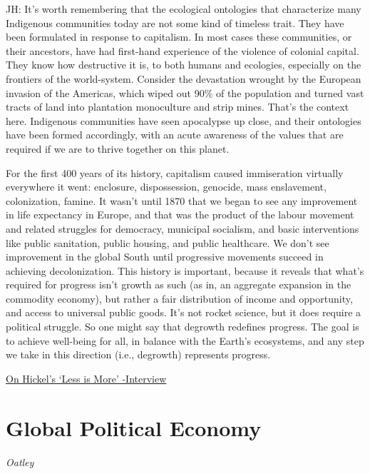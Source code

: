 \documentclass[
]{book}
\begin{document}
JH: It's worth remembering that the ecological ontologies that characterize many Indigenous communities today are not some kind of timeless trait. They have been formulated in response to capitalism. In most cases these communities, or their ancestors, have had first-hand experience of the violence of colonial capital. They know how destructive it is, to both humans and ecologies, especially on the frontiers of the world-system. Consider the devastation wrought by the European invasion of the Americas, which wiped out 90\% of the population and turned vast tracts of land into plantation monoculture and strip mines. That's the context here. Indigenous communities have seen apocalypse up close, and their ontologies have been formed accordingly, with an acute awareness of the values that are required if we are to thrive together on this planet.

For the first 400 years of its history, capitalism caused immiseration virtually everywhere it went: enclosure, dispossession, genocide, mass enslavement, colonization, famine. It wasn't until 1870 that we began to see any improvement in life expectancy in Europe, and that was the product of the labour movement and related struggles for democracy, municipal socialism, and basic interventions like public sanitation, public housing, and public healthcare. We don't see improvement in the global South until progressive movements succeed in achieving decolonization. This history is important, because it reveals that what's required for progress isn't growth as such (as in, an aggregate expansion in the commodity economy), but rather a fair distribution of income and opportunity, and access to universal public goods. It's not rocket science, but it does require a political struggle. So one might say that degrowth redefines progress. The goal is to achieve well-being for all, in balance with the Earth's ecosystems, and any step we take in this direction (i.e., degrowth) represents progress.

\href{https://www.the-trouble.com/content/2021/2/11/ecosocialism-is-the-horizon-degrowth-is-the-way}{On Hickel's `Less is More' -Interview}

\hypertarget{global-political-economy}{%
\chapter{Global Political Economy}\label{global-political-economy}}

\emph{Oatley}
\end{document}
